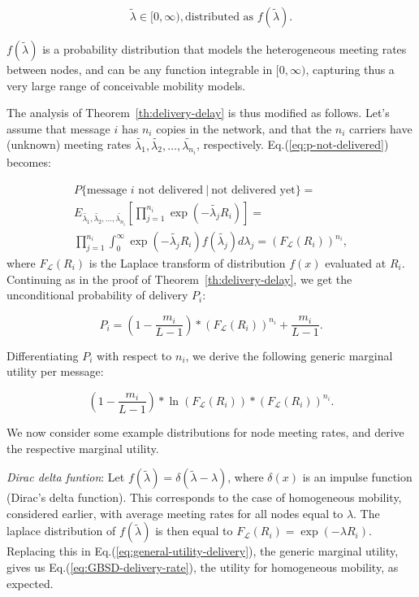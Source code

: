 \begin{equation*}
\tilde{\lambda} \in [0,\infty), \mbox{distributed as } f(\tilde{\lambda}).
\end{equation*}

$f(\tilde{\lambda})$ is a probability distribution that models the heterogeneous meeting rates between nodes, and can be any function integrable in $[0,\infty)$, capturing thus a very large range of conceivable mobility models.

The analysis of Theorem~\ref{th:delivery-delay} is thus modified as follows. Let's assume that message $i$ has $n_{i}$ copies in the network, and that the $n_{i}$ carriers have (unknown) meeting rates $\tilde{\lambda_{1}},\tilde{\lambda_{2}},\dots,\tilde{\lambda_{n_{i}}}$, respectively. Eq.(\ref{eq:p-not-delivered}) becomes:

\begin{eqnarray}
P\{\mbox{message\ $i$ not\ delivered}\ |\ \mbox{not\ delivered\ yet}  \}= \nonumber \\
E_{\tilde{\lambda_{1}},\tilde{\lambda_{2}},\dots,\tilde{\lambda_{n_{i}}}} [ \prod_{j=1}^{n_i}\exp(-\tilde{\lambda_{j}} R_i ) ] = \\
\prod_{j=1}^{n_i} \int_{0}^{\infty} \exp(-\tilde{\lambda_{j}} R_i ) f(\tilde{\lambda_{j}}) d\lambda_{j}  = (F_{\mathcal{L}}(R_{i}))^{n_{i}}, \label{eq:conditional-delivery}
\end{eqnarray}
where $F_{\mathcal{L}}(R_{i})$ is the Laplace transform of distribution $f(x)$ evaluated at $R_{i}$. Continuing as in the proof of Theorem~\ref{th:delivery-delay}, we get the unconditional probability of delivery $P_{i}$:

\begin{equation*}
P_{i} = (1 - \frac{m_i}{L-1})* (F_{\mathcal{L}}(R_{i}))^{n_{i}}+\frac{m_i}{L-1}.
\end{equation*}

Differentiating $P_{i}$ with respect to $n_{i}$, we derive the following generic marginal utility per message:

\begin{equation} \label{eq:general-utility-delivery}
(1 - \frac{m_i}{L-1}) * \ln(F_{\mathcal{L}}(R_{i})) * (F_{\mathcal{L}}(R_{i}))^{n_{i}}.
\end{equation}

We now consider some example distributions for node meeting rates, and derive the respective marginal utility.

\emph{Dirac delta funtion}: Let $f(\tilde{\lambda}) = \delta(\tilde{\lambda} - \lambda)$, where $\delta(x)$ is an impulse function (Dirac's delta function). This corresponds to the case of homogeneous mobility, considered earlier, with average meeting rates for all nodes equal to $\lambda$. The laplace distribution of $f(\tilde{\lambda})$ is then equal to $F_{\mathcal{L}}(R_{i}) = \exp(-\lambda R_{i})$. Replacing this in Eq.(\ref{eq:general-utility-delivery}), the generic marginal utility, gives us Eq.(\ref{eq:GBSD-delivery-rate}), the utility for homogeneous mobility, as expected.

